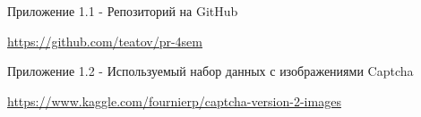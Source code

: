 \documentclass[../document.tex]{subfiles}
\begin{document}
\par Приложение 1.1 - Репозиторий на GitHub
\par \href{https://github.com/teatov/pr-4sem}{https://github.com/teatov/pr-4sem}

\par Приложение 1.2 - Используемый набор данных с изображениями Captcha
\par \href{https://www.kaggle.com/fournierp/captcha-version-2-images}{https://www.kaggle.com/fournierp/captcha-version-2-images}
\end{document}
